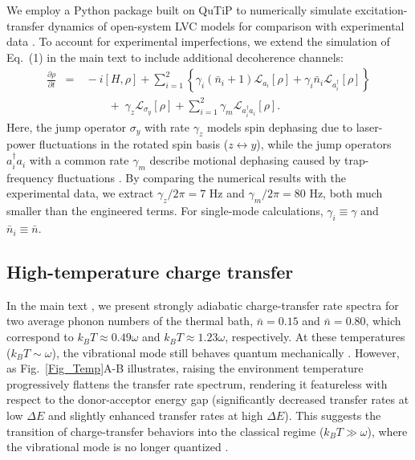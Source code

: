 \documentclass[%
reprint,
superscriptaddress,
amsmath,amssymb,
aps,
prl,
floatfix,
]{revtex4-2}
\begin{document}
We employ a Python package built on QuTiP \cite{johansson2013qutip} to numerically simulate excitation-transfer dynamics of open-system LVC models for comparison with experimental data \cite{so2024electrontransfer,so2025multimode}. To account for experimental imperfections, we extend the simulation of Eq.~(1) in the main text \cite{so2025fT} to include additional decoherence channels:
\begin{eqnarray}
\frac{\partial\rho}{\partial t}\!\!\!&=&\!\!\!-i[H,\rho] +\! \sum_{i=1}^2\left\{\gamma_i (\bar{n}_i+1)\mathcal{L}_{a_i}[\rho] + \gamma_i \bar{n}_i \mathcal{L}_{a_i^\dagger}[\rho]\right\} \nonumber \\
&\quad& \quad\quad+\;\gamma_z\mathcal{L}_{\sigma_y}[\rho]+\sum_{i=1}^2\gamma_{m}\mathcal{L}_{a_i^\dagger a_i}[\rho].
\label{eq_master_mod}
\end{eqnarray}
Here, the jump operator $\sigma_y$ with rate $\gamma_z$ models spin dephasing due to laser-power fluctuations in the rotated spin basis ($z \leftrightarrow y$), while the jump operators $a_i^\dagger a_i$ with a common rate $\gamma_{m}$ describe motional dephasing caused by trap-frequency fluctuations \cite{so2025multimode}. By comparing the numerical results with the experimental data, we extract $\gamma_z/2\pi = 7$ Hz and $\gamma_{m}/2\pi = 80$ Hz, both much smaller than the engineered terms. For single-mode calculations, $\gamma_i\equiv\gamma$ and $\bar{n}_i\equiv\bar{n}$.

\subsection*{High-temperature charge transfer} \label{app_opt}

In the main text \cite{so2025fT}, we present strongly adiabatic charge-transfer rate spectra for two average phonon numbers of the thermal bath, $\bar{n}=0.15$ and $\bar{n}=0.80$, which correspond to $k_B T\approx0.49\omega$ and $k_B T\approx1.23\omega$, respectively. At these temperatures ($k_B T\sim\omega$), the vibrational mode still behaves quantum mechanically  \cite{schlawin2021electrontransfer}. However, as Fig.~\ref{Fig_Temp}A-B illustrates, raising the environment temperature progressively flattens the transfer rate spectrum, rendering it featureless with respect to the donor-acceptor energy gap (significantly decreased transfer rates at low $\Delta E$ and slightly enhanced transfer rates at high $\Delta E$). This suggests the transition of charge-transfer behaviors into the classical regime ($k_B T\gg\omega$), where the vibrational mode is no longer quantized \cite{schlawin2021electrontransfer}. 
\end{document}
